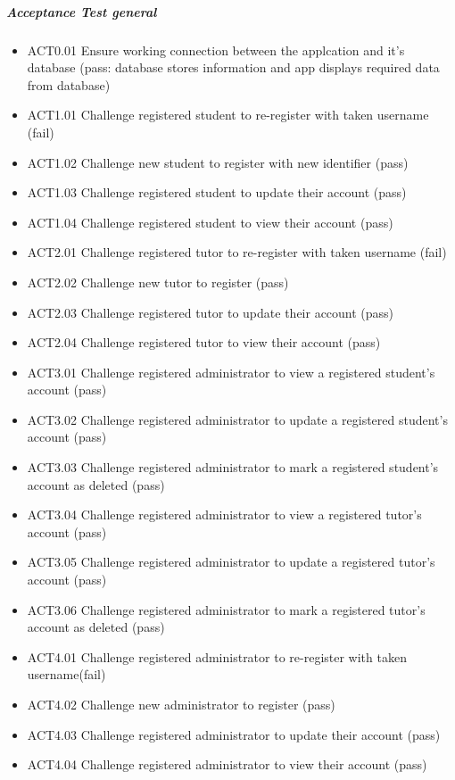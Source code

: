 \documentclass[12pt]{article}
\begin{document}
\subparagraph{Acceptance Test general}
\begin{itemize}
\item ACT0.01	Ensure working connection between the applcation and it's database (pass: database stores information and app displays required data from database)
\item ACT1.01	Challenge registered student to re-register with taken username (fail)
\item ACT1.02	Challenge new student to register with new identifier (pass)
\item ACT1.03	Challenge registered student to update their account (pass)
\item ACT1.04	Challenge registered student to view their account (pass)
\item ACT2.01	Challenge registered tutor to re-register with taken username (fail)
\item ACT2.02	Challenge new tutor to register (pass)
\item ACT2.03	Challenge registered tutor to update their account (pass)
\item ACT2.04	Challenge registered tutor to view their account (pass)
\item ACT3.01	Challenge registered administrator to view a registered student's account (pass)
\item ACT3.02	Challenge registered administrator to update a registered student's account (pass)
\item ACT3.03	Challenge registered administrator to mark a registered student's account as deleted (pass)
\item ACT3.04	Challenge registered administrator to view a registered tutor's account (pass)
\item ACT3.05	Challenge registered administrator to update a registered tutor's account (pass)
\item ACT3.06	Challenge registered administrator to mark a registered tutor's account as deleted (pass)
\item ACT4.01	Challenge registered administrator to re-register with taken username(fail)
\item ACT4.02	Challenge new administrator to register (pass)
\item ACT4.03	Challenge registered administrator to update their account (pass)
\item ACT4.04	Challenge registered administrator to view their account (pass)

\end{itemize}
\end{document}
